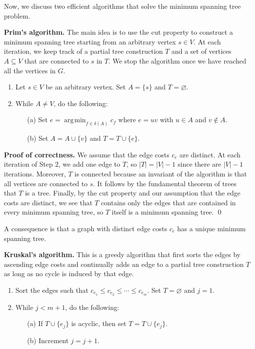\documentclass{article}
\DeclareMathOperator*{\argmin}{\arg\!\min}
\begin{document}
Now, we discuss two efficient algorithms that solve the minimum spanning tree problem.

{\color{violet}
{\bf Prim's algorithm.} The main idea is to use the cut property to 
construct a minimum spanning tree starting from an arbitrary vertex $s \in V$. 
At each iteration, we keep track of a partial tree construction $T$ and a 
set of vertices $A \subseteq V$ that are connected to $s$ in $T$. We stop 
the algorithm once we have reached all the vertices in $G$. 
\begin{enumerate}
    \item Let $s \in V$ be an arbitrary vertex. Set $A = \{s\}$ and $T = \varnothing$. 
    \item While $A \neq V$, do the following: 
    \begin{enumerate}
        \item [(a)] Set $e = \argmin_{f\in\delta(A)} c_f$ where $e = uv$ with 
        $u \in A$ and $v \notin A$. 
        \item [(b)] Set $A = A \cup \{v\}$ and $T = T \cup \{e\}$. 
    \end{enumerate}
\end{enumerate}} 

{\color{blue}
{\bf Proof of correctness.} We assume that the edge costs $c_e$ are distinct. 
At each iteration of Step 2, we add one edge 
to $T$, so $|T| = |V| - 1$ since there are $|V| - 1$ iterations. Moreover, 
$T$ is connected because an invariant of the algorithm is that 
all vertices are connected to $s$. It follows by the fundamental theorem 
of trees that $T$ is a tree. Finally, by the cut property and our assumption 
that the edge costs are distinct, we see that $T$ contains only 
the edges that are contained in every minimum spanning tree, so $T$ 
itself is a minimum spanning tree. \qed}

A consequence is that a graph with distinct edge costs $c_e$ 
has a unique minimum spanning tree.

{\color{violet}
{\bf Kruskal's algorithm.} This is a greedy algorithm that first 
sorts the edges by ascending edge costs and continually adds an 
edge to a partial tree construction $T$ as long as no cycle 
is induced by that edge.
\begin{enumerate}
    \item Sort the edges such that $c_{e_1} \leq c_{e_2} \leq \cdots \leq c_{e_m}$. 
    Set $T = \varnothing$ and $j = 1$. 
    \item While $j < m+1$, do the following: 
    \begin{enumerate}
        \item [(a)] If $T \cup \{e_j\}$ is acyclic, then set $T = T \cup \{e_j\}$. 
        \item [(b)] Increment $j = j + 1$. 
    \end{enumerate}
\end{enumerate}} 
\end{document}
